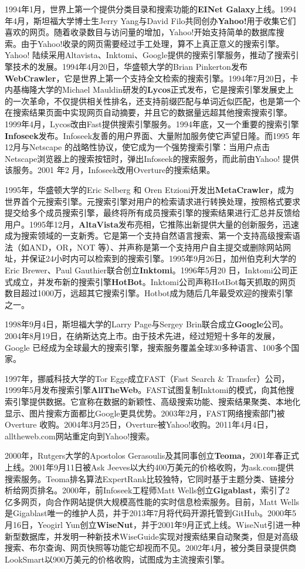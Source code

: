 \begin{shaded}
1994年1月，世界上第一个提供分类目录和搜索功能的\textbf{EINet Galaxy}上线。1994年4月，斯坦福大学博士生Jerry Yang与David Filo共同创办\textbf{Yahoo!}用于收集它们喜欢的网页。随着收录数目与访问量的增加，Yahoo!开始支持简单的数据库搜索。由于Yahoo!收录的网页需要经过手工处理，算不上真正意义的搜索引擎。Yahoo! 陆续采用Altavista、Inktomi、Google提供的搜索引擎服务，推动了搜索引擎技术的发展。1994年4月20日，华盛顿大学的Brian Pinkerton发布
\textbf{WebCrawler}，它是世界上第一个支持全文检索的搜索引擎。1994年7月20日，卡内基梅隆大学的Michael Mauldin研发的\textbf{Lycos}正式发布，它是搜索引擎发展史上的一次革命，不仅提供相关性排名，还支持前缀匹配与单词近似匹配，也是第一个在搜索结果页面中实现网页自动摘要，并且它的数据量远超其他搜索搜索引擎。1999年4月，Lycos改由Fast提供搜索引擎服务。1994年底，又一个重要的搜索引擎\textbf{Infoseek}发布。Infoseek友善的用户界面、大量附加服务使它声望日隆。而1995 年12月与Netscape 的战略性协议，使它成为一个强势搜索引擎：当用户点击Netscape浏览器上的搜索按钮时，弹出Infoseek的搜索服务，而此前由Yahoo! 提供该服务。2001 年2 月，Infoseek改用Overture的搜索结果。

1995年，华盛顿大学的Eric Selberg 和 Oren Etzioni开发出\textbf{MetaCrawler}，成为世界首个元搜索引擎。元搜索引擎对用户的检索请求进行转换处理，按照格式要求提交给多个成员搜索引擎，最终将所有成员搜索引擎的搜索结果进行汇总并反馈给用户。1995年12月，\textbf{AltaVista}发布亮相，它推陈出新提供大量的创新服务，迅速成为搜索领域的一支新秀。它是第一个支持自然语言搜索、第一个支持高级搜索语法（如AND，OR，NOT 等）、并声称是第一个支持用户自主提交或删除网站网址，并保证24小时内可以检索到的搜索引擎。1995年9月26日，加州伯克利大学的Eric Brewer、Paul Gauthier联合创立\textbf{Inktomi}。1996年5月20 日，Inktomi公司正式成立，并发布新的搜索引擎\textbf{HotBot}。Inktomi公司声称HotBot每天抓取的网页数目超过1000万，远超其它搜索引擎。Hotbot成为随后几年最受欢迎的搜索引擎之一。

1998年9月4日，斯坦福大学的Larry Page与Sergey Brin联合成立\textbf{Google}公司。2004年8月19日，在纳斯达克上市。由于技术先进，经过短短十多年的发展，Google 已经成为全球最大的搜索引擎，搜索服务覆盖全球30多种语言、100多个国家。

1997年，挪威科技大学的Tor Egge成立FAST（Fast Search \& Transfer）公司，1999年5月发布搜索引擎\textbf{AllTheWeb}。FAST试图复制Inktomi的模式，向其他搜索引擎提供数据。它宣称在数据的新颖性、高级搜索功能、搜索结果聚类、本地化显示、图片搜索方面都比Google更具优势。2003年2月，FAST网络搜索部门被Overture 收购。2004年3月25日，Overture被Yahoo!收购。2011年4月4日，alltheweb.com网站重定向到Yahoo!搜索。

2000年，Rutgers大学的Apostolos Gerasoulis及其同事创立\textbf{Teoma}，2001年春正式上线。2001年9月11日被Ask Jeeves以大约400万美元的价格收购，为ask.com提供搜索服务。Teoma排名算法ExpertRank比较独特，它同时基于主题分类、链接分析给网页排名。2000年，前Infoseek工程师Matt Wells创立\textbf{Gigablast}，索引了2 亿多网页，向合作网站提供大规模高性能的实时信息检索服务。目前，Matt Wells是Gigablast唯一的维护人员，并于2013年7月将代码开源托管到GitHub。2000年5月16日，Yeogirl Yun创立\textbf{WiseNut}，并于2001年9月正式上线。WiseNut引进一种新型数据库，并发明一种新技术WiseGuide实现对搜索结果自动聚类，但是对高级搜索、布尔查询、网页快照等功能它却视而不见。2002年4月，被分类目录提供商LookSmart以900万美元的价格收购，试图成为主流搜索引擎。


\end{shaded}
